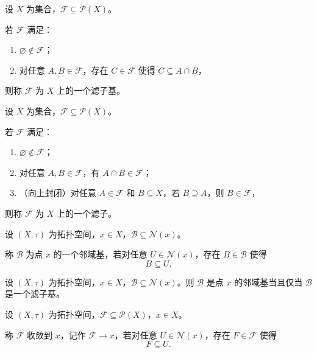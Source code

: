 \documentclass[lang=cn,a4paper,newtx,figureplace=section,tableplace=section]{elegantbook}
\begin{document}
\begin{definition}[滤子基]\label{def:filter-base}
设 $X$ 为集合，$\mathcal{F} \subseteq \mathcal{P}(X)$。

若 $\mathcal{F}$ 满足：
\begin{enumerate}
    \item $\varnothing \notin \mathcal{F}$；
    \item 对任意 $A, B \in \mathcal{F}$，存在 $C \in \mathcal{F}$ 使得 $C \subseteq A \cap B$，
\end{enumerate}
则称 $\mathcal{F}$ 为 $X$ 上的一个滤子基。
\end{definition}

\begin{definition}[滤子]\label{def:filter}
设 $X$ 为集合，$\mathcal{F} \subseteq \mathcal{P}(X)$。

若 $\mathcal{F}$ 满足：
\begin{enumerate}
    \item $\varnothing \notin \mathcal{F}$；
    \item 对任意 $A, B \in \mathcal{F}$，有 $A \cap B \in \mathcal{F}$；
    \item （向上封闭）对任意 $A \in \mathcal{F}$ 和 $B \subseteq X$，若 $B \supseteq A$，则 $B \in \mathcal{F}$，
\end{enumerate}
则称 $\mathcal{F}$ 为 $X$ 上的一个滤子。
\end{definition}

\begin{definition}[邻域基]\label{def:neighborhood-base}
设 $(X,\tau)$ 为拓扑空间，$x \in X$，$\mathcal{B} \subseteq \mathcal{N}(x)$。

称 $\mathcal{B}$ 为点 $x$ 的一个邻域基，若对任意 $U \in \mathcal{N}(x)$，存在 $B \in \mathcal{B}$ 使得
\begin{equation}
B \subseteq U.
\end{equation}
\end{definition}

\begin{proposition}\label{prop:neighborhood-base-filter-base}
设 $(X,\tau)$ 为拓扑空间，$x \in X$，$\mathcal{B} \subseteq \mathcal{N}(x)$。则 $\mathcal{B}$ 是点 $x$ 的邻域基当且仅当 $\mathcal{B}$ 是一个滤子基。
\end{proposition}

\begin{definition}[滤子收敛]\label{def:filter-convergence}
设 $(X,\tau)$ 为拓扑空间，$\mathcal{F} \subseteq \mathcal{P}(X)$，$x \in X$。

称 $\mathcal{F}$ 收敛到 $x$，记作 $\mathcal{F} \to x$，若对任意 $U \in \mathcal{N}(x)$，存在 $F \in \mathcal{F}$ 使得
\begin{equation}
F \subseteq U.
\end{equation}
\end{definition}
\end{document}
